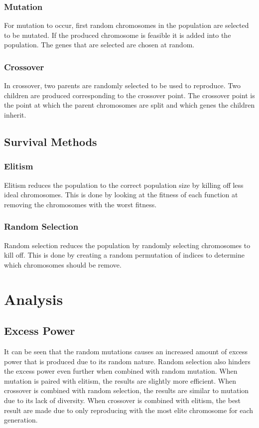 \documentclass[conference]{IEEEtran}
\begin{document}
    \subsubsection{Mutation}
    For mutation to occur, first random chromosomes in the population are selected to be mutated.  If the produced chromosome is feasible it is added into the population.  The genes that are selected are chosen at random.
    \subsubsection{Crossover}
    In crossover, two parents are randomly selected to be used to reproduce.  Two children are produced corresponding to the crossover point. The crossover point is the point at which the parent chromosomes are split and which genes the children inherit.
    \subsection{Survival Methods}
    \subsubsection{Elitism}
    Elitism reduces the population to the correct population size by killing off less ideal chromosomes.  This is done by looking at the fitness of each function at removing the chromosomes with the worst fitness.
    \subsubsection{Random Selection}
    Random selection reduces the population by randomly selecting chromosomes to kill off.  This is done by creating a random permutation of indices to determine which chromosomes should be remove.

    \section{Analysis}
    \subsection{Excess Power}
    It can be seen that the random mutations causes an increased amount of excess power that is produced due to its random nature.  Random selection also hinders the excess power even further when combined with random mutation. When mutation is paired with elitism, the results are slightly more efficient.  When crossover is combined with random selection, the results are similar to mutation due to its lack of diversity.  When crossover is combined with elitism, the best result are made due to only reproducing with the most elite chromosome for each generation.
\end{document}
